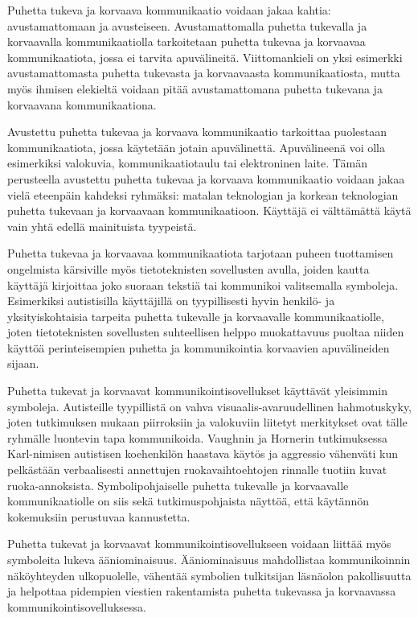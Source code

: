 \documentclass[utf8]{gradu3}
\begin{document}
Puhetta tukeva ja korvaava kommunikaatio voidaan jakaa kahtia: avustamattomaan ja avusteiseen. Avustamattomalla puhetta tukevalla ja korvaavalla kommunikaatiolla tarkoitetaan puhetta tukevaa ja korvaavaa kommunikaatiota, jossa ei tarvita apuvälineitä. Viittomankieli on yksi esimerkki avustamattomasta puhetta tukevasta ja korvaavaasta kommunikaatiosta, mutta myös ihmisen elekieltä voidaan pitää avustamattomana puhetta tukevana ja korvaavana kommunikaationa. 

Avustettu puhetta tukevaa ja korvaava kommunikaatio tarkoittaa puolestaan kommunikaatiota, jossa käytetään jotain apuvälinettä. Apuvälineenä voi olla esimerkiksi valokuvia, kommunikaatiotaulu tai elektroninen laite. Tämän perusteella avustettu puhetta tukevaa ja korvaava kommunikaatio voidaan jakaa vielä eteenpäin kahdeksi ryhmäksi: matalan teknologian ja korkean teknologian puhetta tukevaan ja korvaavaan kommunikaatioon. Käyttäjä ei välttämättä käytä vain yhtä edellä mainituista tyypeistä. \parencite[]{AAC-conditional-use}

Puhetta tukevaa ja korvaavaa kommunikaatiota tarjotaan puheen tuottamisen ongelmista kärsiville myös tietoteknisten sovellusten avulla, joiden kautta käyttäjä kirjoittaa joko suoraan tekstiä tai kommunikoi valitsemalla symboleja. Esimerkiksi autistisilla käyttäjillä on tyypillisesti hyvin henkilö- ja yksityiskohtaisia tarpeita puhetta tukevalle ja korvaavalle kommunikaatiolle, joten tietoteknisten sovellusten suhteellisen helppo muokattavuus puoltaa niiden käyttöä perinteisempien puhetta ja kommunikointia korvaavien apuvälineiden sijaan.

Puhetta tukevat ja korvaavat kommunikointisovellukset käyttävät yleisimmin symboleja. Autisteille tyypillistä on vahva visuaalis-avaruudellinen hahmotuskyky, joten tutkimuksen mukaan piirroksiin ja valokuviin liitetyt merkitykset ovat tälle ryhmälle luontevin tapa kommunikoida. Vaughnin ja Hornerin tutkimuksessa  \parencite[]{concrete-versus-verbal} Karl-nimisen autistisen koehenkilön haastava käytös ja aggressio vähenväti kun pelkästään verbaalisesti annettujen ruokavaihtoehtojen rinnalle tuotiin kuvat ruoka-annoksista. Symbolipohjaiselle puhetta tukevalle ja korvaavalle kommunikaatiolle on siis sekä tutkimuspohjaista näyttöä, että käytännön kokemuksiin perustuvaa kannustetta.

Puhetta tukevat ja korvaavat kommunikointisovellukseen voidaan liittää myös symboleita lukeva ääniominaisuus. Ääniominaisuus mahdollistaa kommunikoinnin näköyhteyden ulkopuolelle, vähentää symbolien tulkitsijan läsnäolon pakollisuutta ja helpottaa pidempien viestien rakentamista puhetta tukevassa ja korvaavassa kommunikointisovelluksessa.\parencite[]{AAC-interventions}
\end{document}
